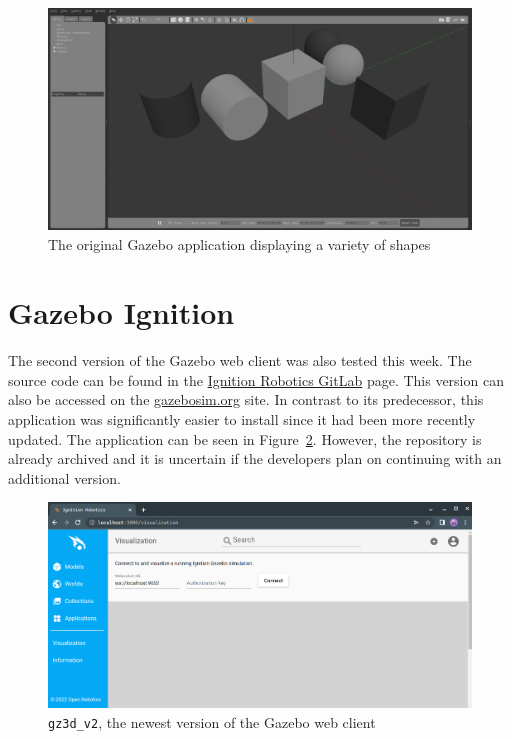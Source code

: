     \begin{figure}[H]
        \centering
        \includegraphics[width=\linewidth]{Images/08_gazAppBoxes.png}
        \caption{The original Gazebo application displaying a variety of shapes}
        \label{fig:gazBoxes}
    \end{figure}
    
\section{Gazebo Ignition}

    The second version of the Gazebo web client was also tested this week. The source code can be found in the \href{https://gitlab.com/ignitionrobotics/web/app/-/tree/gz3d_v2/}{Ignition Robotics GitLab} page. This version can also be accessed on the \href{https://app.gazebosim.org/dashboard}{gazebosim.org} site. In contrast to its predecessor, this application was significantly easier to install since it had been more recently updated. The application can be seen in Figure~\ref{fig:Ignition}. However, the repository is already archived and it is uncertain if the developers plan on continuing with an additional version.

    \begin{figure}[H]
        \centering
        \includegraphics[width=\linewidth]{Images/08_ignition.png}
        \caption{\texttt{gz3d\_v2}, the newest version of the Gazebo web client}
        \label{fig:Ignition}
    \end{figure}



